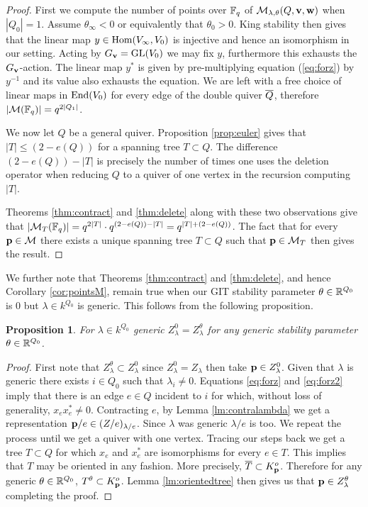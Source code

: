 \documentclass{amsart}
\newtheorem{prop}[thm]{Proposition}
\theoremstyle{definition}
\begin{document}
\begin{proof}
First we compute the number of points over $\mathbb{F}_q$ of $\mathcal{M}_{\lambda,\theta}(Q, \mathbf{v}, \mathbf{w})$ when $|Q_0|=1$.
Assume $\theta_\infty<0$ or equivalently that $\theta_0>0$.
King stability then gives that the linear map $y \in \operatorname{Hom}(V_\infty, V_0)$ is injective and hence an isomorphism in our setting.
Acting by $G_{\mathbf{v}} = \operatorname{GL}(V_0)$ we may fix $y$, furthermore this exhausts the $G_{\mathbf{v}}$-action.
The linear map $y^*$ is given by pre-multiplying equation (\ref{eq:forz}) by $y^{-1}$ and its value also exhausts the equation.
We are left with a free choice of linear maps in $\operatorname{End}(V_0)$ for every edge of the double quiver ${\overline{Q}}$, therefore $|\mathcal{M}(\mathbb{F}_q)|=q^{2|Q_1|}$.

We now let $Q$ be a general quiver. 
Proposition \ref{prop:euler} gives that $|T| \leq (2-e(Q))$ for a spanning tree $T \subset Q$.
The difference $(2-e(Q))-|T|$ is precisely the number of times one uses the deletion operator when reducing $Q$ to a quiver of one vertex in the recursion computing $|T|$.

Theorems \ref{thm:contract} and \ref{thm:delete} along with these two observations give that $|\mathcal{M}_T(\mathbb{F}_q)|= q^{2 |T|} \cdot q^{(2-e(Q))-|T|} = q^{|T|+(2- e(Q))}$.
The fact that for every $\mathbf{p} \in \mathcal{M}$ there exists a unique spanning tree $T \subset Q$ such that $\mathbf{p} \in \mathcal{M}_T$ then gives the result.
\end{proof}

We further note that Theorems \ref{thm:contract} and \ref{thm:delete}, and hence Corollary \ref{cor:pointsM}, remain true when our GIT stability parameter $\theta\in \mathbb{R}^{Q_0}$ is 0 but $\lambda \in k^{Q_0}$ is generic.
This follows from the following proposition.

\begin{prop}
For $\lambda \in k^{Q_0}$ generic $Z_\lambda^0 = Z_\lambda^\theta$ for any generic stability parameter $\theta\in \mathbb{R}^{Q_0}$.
\end{prop}

\begin{proof}
First note that $Z_\lambda^\theta \subset Z_\lambda^0$ since $Z_\lambda^0 = Z_\lambda$ then take $\mathbf{p} \in Z_\lambda^0$.
Given that $\lambda$ is generic there exists $i \in Q_0$ such that $\lambda_i\neq 0$.
Equations \ref{eq:forz} and \ref{eq:forz2} imply that there is an edge $e\in Q$ incident to $i$ for which, without loss of generality, $x_ex_e^* \neq 0$.
Contracting $e$, by Lemma \ref{lm:contralambda} we get a representation $\mathbf{p}/e \in (Z/e)_{\lambda/e}$.
Since $\lambda$ was generic $\lambda/e$ is too.
We repeat the process until we get a quiver with one vertex.
Tracing our steps back we get a tree $T \subset Q$ for which $x_e$ and $x_e^*$ are isomorphisms for every $e \in T$.
This implies that $T$ may be oriented in any fashion.
More precisely, ${\overline{T}} \subset K_{\mathbf{p}}^o$.
Therefore for any generic $\theta \in \mathbb{R}^{Q_0}$, $T^\theta \subset K_{\mathbf{p}}^o$.
Lemma \ref{lm:orientedtree} then gives us that $\mathbf{p} \in Z_\lambda^\theta$ completing the proof.
\end{proof}
\end{document}
